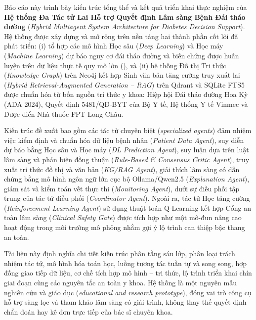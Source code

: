 \documentclass[a4paper,12pt,oneside]{report}
\begin{document}
\setcounter{page}{2}

Báo cáo này trình bày kiến trúc tổng thể và kết quả triển khai thực nghiệm của \textbf{Hệ thống Đa Tác tử Lai Hỗ trợ Quyết định Lâm sàng Bệnh Đái tháo đường} (\emph{Hybrid Multiagent System Architecture for Diabetes Decision Support}). Hệ thống được xây dựng và mở rộng trên nền tảng hai thành phần cốt lõi đã phát triển: (i) tổ hợp các mô hình Học sâu (\emph{Deep Learning}) và Học máy (\emph{Machine Learning}) dự báo nguy cơ đái tháo đường và biến chứng được huấn luyện trên dữ liệu thực tế quy mô lớn (), và (ii) hệ thống Đồ thị Tri thức (\emph{Knowledge Graph}) trên Neo4j kết hợp Sinh văn bản tăng cường truy xuất lai (\emph{Hybrid Retrieval-Augmented Generation -- RAG}) trên Qdrant và SQLite FTS5 được chuẩn hóa từ bốn nguồn tri thức y khoa: Hiệp hội Đái tháo đường Hoa Kỳ (ADA 2024), Quyết định 5481/QĐ-BYT của Bộ Y tế, Hệ thống Y tế Vinmec và Dược điển Nhà thuốc FPT Long Châu.

Kiến trúc đề xuất bao gồm các tác tử chuyên biệt (\emph{specialized agents}) đảm nhiệm việc kiểm định và chuẩn hóa dữ liệu bệnh nhân (\emph{Patient Data Agent}), suy diễn dự báo bằng Học sâu và Học máy (\emph{DL Prediction Agent}), suy luận dựa trên luật lâm sàng và phản biện đồng thuận (\emph{Rule-Based \& Consensus Critic Agent}), truy xuất tri thức đồ thị và văn bản (\emph{KG/RAG Agent}), giải thích lâm sàng có dẫn chứng bằng mô hình ngôn ngữ lớn cục bộ Ollama/Qwen2.5 (\emph{Explanation Agent}), giám sát và kiểm toán vết thực thi (\emph{Monitoring Agent}), dưới sự điều phối tập trung của tác tử điều phối (\emph{Coordinator Agent}). Ngoài ra, tác tử Học tăng cường (\emph{Reinforcement Learning Agent}) sử dụng thuật toán Q-Learning kết hợp Cổng an toàn lâm sàng (\emph{Clinical Safety Gate}) được tích hợp như một mô-đun nâng cao hoạt động trong môi trường mô phỏng nhằm gợi ý lộ trình can thiệp bậc thang an toàn.

Tài liệu này định nghĩa chi tiết kiến trúc phân tầng sáu lớp, phân loại trách nhiệm tác tử, mô hình hóa toán học, luồng tương tác tuần tự và song song, hợp đồng giao tiếp dữ liệu, cơ chế tích hợp mô hình -- tri thức, lộ trình triển khai chín giai đoạn cùng các nguyên tắc an toàn y khoa. Hệ thống là một nguyên mẫu nghiên cứu và giáo dục (\emph{educational and research prototype}), đóng vai trò công cụ hỗ trợ sàng lọc và tham khảo lâm sàng có giải trình, không thay thế quyết định chẩn đoán hay kê đơn trực tiếp của bác sĩ chuyên khoa.
\end{document}

